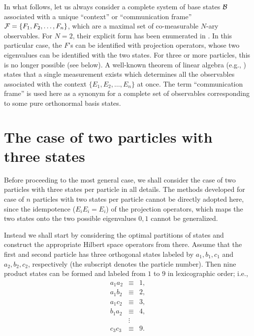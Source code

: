 In what follows, let us always consider a complete
system of base states  ${\cal B}$ associated with a unique ``context'' \cite{svozil-2001-cesena}
or ``communication frame''
 ${\cal F}=\{F_1,F_2, \ldots ,F_{n} \}$, which are a maximal set of
co-measurable $N$-ary observables.
For $N=2$,
their explicit form has been enumerated in  \cite{DonSvo01}.
In this particular case, the $F$'s can be identified with projection
operators,
whose two eigenvalues can be identified with the two states.
For three or more particles, this is no longer possible (see below).
A well-known theorem of linear algebra
(e.g.,
\cite{halmos-vs})
states that a single measurement exists which determines
all the observables associated with the context
$\{E_1,E_2, \ldots ,E_{n} \}$ at once.
The term ``communication frame'' is used here
as a synonym for a complete set of observables corresponding
to some pure orthonormal basis states.


\section{The case of two particles with three states}

Before proceeding to the most general case,
we shall consider the case of two particles
with three states per particle in all details.
The methods  developed \cite{DonSvo01} for case of $n$
particles
with two states per particle cannot be directly adopted here,
since the idempotence ($E_iE_i=E_i$) of the projection operators,
which maps the two states onto the two possible eigenvalues $0,1$ cannot
be generalized.

Instead we shall start by considering the optimal partitions of
states and construct the appropriate Hilbert space operators from there.
Assume that the first and second particle
has three orthogonal states labeled by
$a_1,b_1,c_1$
and
$a_2,b_2,c_2$,
respectively
(the subscript denotes the particle number).
Then nine product states can be formed and labeled from $1$ to $9$ in
lexicographic order; i.e.,
\begin{equation}
\begin{array}{llll}
a_1a_2 &\equiv&1,\\
a_1b_2 &\equiv&2,\\
a_1c_2 &\equiv&3,\\
b_1a_2 &\equiv&4,\\
  &\vdots& \\
c_3c_3 &\equiv&9.\\
\end{array}
\label{2001-general-ps3}
\end{equation}

